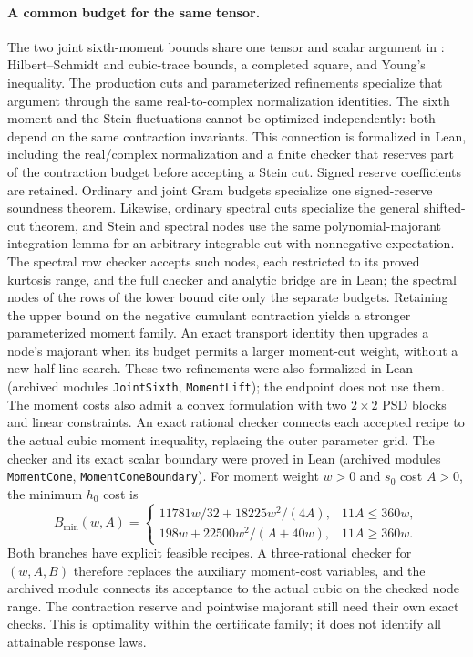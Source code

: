 \documentclass[11pt,a4paper]{article}
\newcommand{\lean}[1]{\texttt{\small #1}}
\begin{document}
\paragraph{A common budget for the same tensor.}
The two joint sixth-moment bounds share one tensor and scalar argument in
: Hilbert--Schmidt and cubic-trace bounds, a completed
square, and Young's inequality. The production cuts and parameterized refinements
specialize that argument through the same real-to-complex normalization identities.
The sixth moment and the Stein fluctuations cannot be optimized independently:
both depend on the same contraction invariants. This connection is formalized
in Lean, including the real/complex normalization and a finite checker that reserves
part of the contraction budget before accepting a Stein cut. Signed reserve
coefficients are retained. Ordinary and joint Gram budgets specialize one signed-reserve
soundness theorem. Likewise, ordinary spectral cuts specialize the general shifted-cut
theorem, and Stein and spectral nodes use the same polynomial-majorant integration lemma for an
arbitrary integrable cut with nonnegative expectation. The spectral row checker accepts such nodes, each restricted
to its proved kurtosis range, and the full checker and analytic bridge are in Lean; the spectral nodes of the rows of
the lower bound cite only the separate budgets.
Retaining the upper bound on the negative cumulant contraction yields a stronger
parameterized moment family. An exact transport identity then upgrades a node's
majorant when its budget permits a larger moment-cut weight, without a new
half-line search. These two refinements were also formalized in Lean
(archived modules \lean{JointSixth}, \lean{MomentLift}); the endpoint does not use them.
The moment costs also admit a convex formulation with two $2\times2$ PSD blocks
and linear constraints. An exact rational checker connects each accepted recipe
to the actual cubic moment inequality, replacing the outer parameter grid.
The checker and its exact scalar boundary were proved in Lean (archived modules
\lean{MomentCone}, \lean{MomentConeBoundary}). For moment weight $w>0$ and
$s_0$ cost $A>0$, the minimum $h_0$ cost is
\[
 B_{\min}(w,A)=
 \begin{cases}
 11781w/32+18225w^2/(4A),&11A\le360w,\\
 198w+22500w^2/(A+40w),&11A\ge360w.
 \end{cases}
\]
Both branches have explicit feasible recipes. A three-rational checker for
$(w,A,B)$ therefore replaces the auxiliary moment-cost variables, and the
archived module connects its acceptance to the actual cubic on the checked node range. The
contraction reserve and pointwise majorant still need their own exact checks.
This is optimality within the certificate family; it does not identify all
attainable response laws.
\end{document}
